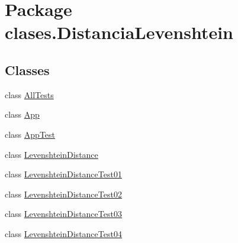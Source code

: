 \hypertarget{namespaceclases_1_1_distancia_levenshtein}{}\section{Package clases.\+Distancia\+Levenshtein}
\label{namespaceclases_1_1_distancia_levenshtein}
\subsection*{Classes}
\begin{DoxyCompactItemize}
\item 
class \hyperlink{classclases_1_1_distancia_levenshtein_1_1_all_tests}{All\+Tests}
\item 
class \hyperlink{classclases_1_1_distancia_levenshtein_1_1_app}{App}
\item 
class \hyperlink{classclases_1_1_distancia_levenshtein_1_1_app_test}{App\+Test}
\item 
class \hyperlink{classclases_1_1_distancia_levenshtein_1_1_levenshtein_distance}{Levenshtein\+Distance}
\item 
class \hyperlink{classclases_1_1_distancia_levenshtein_1_1_levenshtein_distance_test01}{Levenshtein\+Distance\+Test01}
\item 
class \hyperlink{classclases_1_1_distancia_levenshtein_1_1_levenshtein_distance_test02}{Levenshtein\+Distance\+Test02}
\item 
class \hyperlink{classclases_1_1_distancia_levenshtein_1_1_levenshtein_distance_test03}{Levenshtein\+Distance\+Test03}
\item 
class \hyperlink{classclases_1_1_distancia_levenshtein_1_1_levenshtein_distance_test04}{Levenshtein\+Distance\+Test04}
\end{DoxyCompactItemize}
